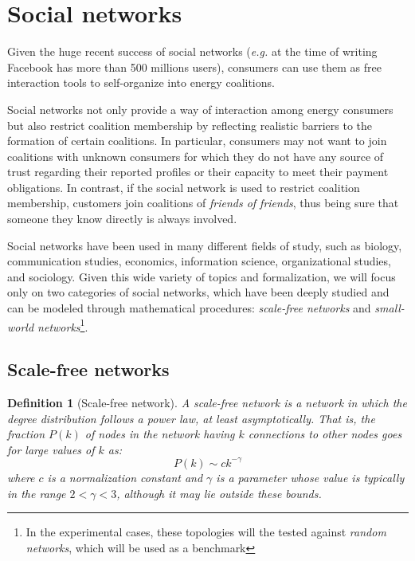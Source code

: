 \documentclass[11pt, twoside, titlepage, a4paper, openright]{report}
\newtheorem{Def}{Definition}
\begin{document}
\section{Social networks}\label{sec:socnet}

Given the huge recent success of social networks (\textit{e.g.} at the time of writing Facebook has more
than 500 millions users), consumers can use them as free interaction tools to self-organize into energy coalitions.

Social networks not only provide a way of interaction
among energy consumers but also restrict coalition membership by reflecting
realistic barriers to the formation of certain coalitions. In
particular, consumers may not want to join coalitions with unknown consumers for
which they do not have any source of trust regarding their reported profiles or
their capacity to meet their payment obligations. In contrast, if the social
network is used to restrict coalition membership, customers join
coalitions of \emph{friends of friends}, thus being sure that someone they know directly is always involved.

Social networks have been used in many different fields of study, such as biology, communication studies, economics, information science, organizational studies, and sociology. Given this wide variety of topics and formalization, we will focus only on two categories of social networks, which have been deeply studied and can be modeled through mathematical procedures: \textit{scale-free networks} and \textit{small-world networks}\footnote{In the experimental cases, these topologies will the tested against \textit{random networks}, which will be used as a benchmark}.

\subsection{Scale-free networks}

\begin{Def}[Scale-free network]
A \textit{scale-free network} is a network in which the degree distribution follows a power law, at least asymptotically. That is, the fraction $P(k)$ of nodes in the network having $k$ connections to other nodes goes for large values of $k$ as:
$$P\left(k\right) \sim ck^{-\gamma}$$
where $c$ is a normalization constant and $\gamma$ is a parameter whose value is typically in the range $2 < \gamma < 3$, although it may lie outside these bounds.
\end{Def}
\end{document}
